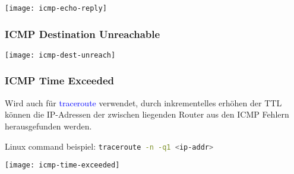 \begin{center}
    \texttt{[image: icmp-echo-reply]}
\end{center}


\subsubsection{ICMP Destination Unreachable}

\begin{center}
    \texttt{[image: icmp-dest-unreach]}
\end{center}

\subsubsection{ICMP Time Exceeded}

Wird auch für \textcolor{blue}{traceroute} verwendet, durch inkrementelles erhöhen der TTL
können die IP-Adressen der zwischen liegenden Router aus den ICMP Fehlern
herausgefunden werden.

Linux command beispiel: \lstinline[language=sh]{traceroute -n -q1 <ip-addr>}

\begin{center}
    \texttt{[image: icmp-time-exceeded]}
\end{center}

